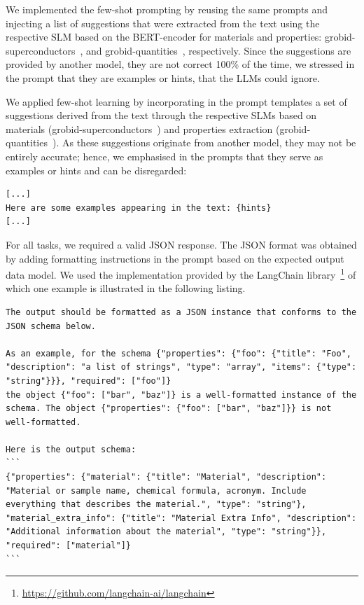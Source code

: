 \documentclass[a4paper]{article}
\begin{document}
We implemented the few-shot prompting by reusing the same prompts and injecting a list of suggestions that were extracted from the text using the respective SLM based on the BERT-encoder for materials and properties: grobid-superconductors~\cite{lfoppiano2023automatic}, and grobid-quantities~\cite{foppiano2019quantities}, respectively.
Since the suggestions are provided by another model, they are not correct 100\% of the time, we stressed in the prompt that they are examples or hints, that the LLMs could ignore. 

We applied few-shot learning by incorporating in the prompt templates a set of suggestions derived from the text through the respective SLMs based on materials (grobid-superconductors~\cite{lfoppiano2023automatic}) and properties extraction (grobid-quantities~\cite{foppiano2019quantities}). 
As these suggestions originate from another model, they may not be entirely accurate; hence, we emphasised in the prompts that they serve as examples or hints and can be disregarded: 

\begin{lstlisting}[caption=Few-shot learning modified prompt template.]
[...]
Here are some examples appearing in the text: {hints}
[...]
\end{lstlisting}

For all tasks, we required a valid JSON response. The JSON format was obtained by adding formatting instructions in the prompt based on the expected output data model. 
We used the implementation provided by the LangChain library~\footnote{\url{https://github.com/langchain-ai/langchain}} of which one example is illustrated in the following listing. 

\begin{lstlisting}[caption=Example of formatting instruction to a valid JSON format]
The output should be formatted as a JSON instance that conforms to the JSON schema below.

As an example, for the schema {"properties": {"foo": {"title": "Foo", "description": "a list of strings", "type": "array", "items": {"type": "string"}}}, "required": ["foo"]}
the object {"foo": ["bar", "baz"]} is a well-formatted instance of the schema. The object {"properties": {"foo": ["bar", "baz"]}} is not well-formatted.

Here is the output schema:
```
{"properties": {"material": {"title": "Material", "description": "Material or sample name, chemical formula, acronym. Include everything that describes the material.", "type": "string"}, "material_extra_info": {"title": "Material Extra Info", "description": "Additional information about the material", "type": "string"}}, "required": ["material"]}
```
\end{lstlisting}
\end{document}
